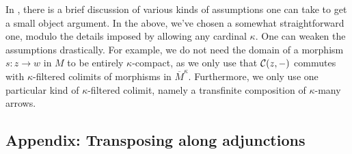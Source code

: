 \begin{remark}
	In \cite[§12.2]{riehl-categorical-homotopy-theory}, there is a brief discussion of various kinds of assumptions one can take to get a small object argument. In the above, we've chosen
	a somewhat straightforward one, modulo the details imposed by allowing any cardinal \(\kappa\). One can weaken the assumptions drastically. For example, we do not need the domain
	of a morphism \(s\!:z\to w\) in \(M\) to be entirely \(\kappa\)-compact, as we only use that \(\mathcal{C}(z,-)\) commutes with \(\kappa\)-filtered colimits of morphisms in \(\overline{M}^\kappa\).
	Furthermore, we only use one particular kind of \(\kappa\)-filtered colimit, namely a transfinite composition of \(\kappa\)-many arrows.
\end{remark}


\subsection{Appendix: Transposing along adjunctions}



